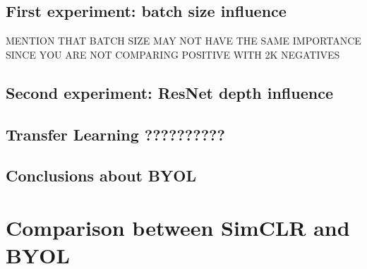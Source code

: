 \subsection{First experiment: batch size influence}

MENTION THAT BATCH SIZE MAY NOT HAVE THE SAME IMPORTANCE SINCE YOU ARE NOT COMPARING POSITIVE WITH 2K NEGATIVES

\subsection{Second experiment: ResNet depth influence}

\subsection{Transfer Learning ??????????}

\subsection{Conclusions about BYOL}

\section{Comparison between SimCLR and BYOL}